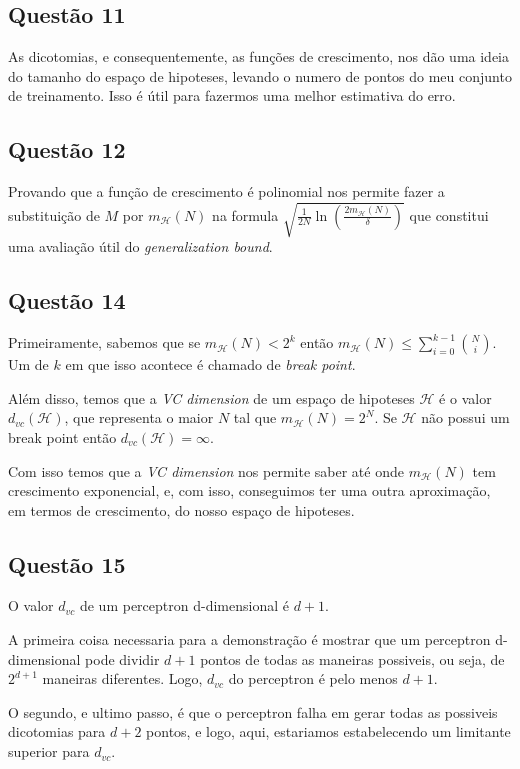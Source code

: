 \documentclass[12pt, a4paper]{article}
\begin{document}
\subsection*{Questão 11} {
    As dicotomias, e consequentemente, as funções de crescimento, nos dão uma ideia do tamanho do espaço de hipoteses, levando o numero de pontos do meu conjunto de treinamento. Isso é útil para fazermos uma melhor estimativa do erro.
}

\subsection*{Questão 12} {
    Provando que a função de crescimento é polinomial nos permite fazer a substituição de $ M $ por $ m_{\mathcal{H}}(N) $ na formula $ \sqrt{\frac{1}{2N} \ln(\frac{2m_{\mathcal{H}}(N)}{\delta})} $ que constitui uma avaliação útil do \emph{generalization bound}.   
}


\subsection*{Questão 14} {
    Primeiramente, sabemos que se $ m_{\mathcal{H}}(N) < 2^k $ então $ m_{\mathcal{H}}(N) \le \sum^{k-1}_{i = 0}\binom{N}{i} $. Um de $k$ em que isso acontece é chamado de \emph{break point}. 

    Além disso, temos que a \emph{VC dimension} de um espaço de hipoteses $\mathcal{H}$ é o valor $ d_{vc}(\mathcal{H}) $, que representa o maior $N$ tal que $ m_{\mathcal{H}}(N) = 2^N $. Se $\mathcal{H}$ não possui um break point então $d_{vc}(\mathcal{H}) = \infty$.

    Com isso temos que a \emph{VC dimension} nos permite saber até onde $ m_{\mathcal{H}}(N) $ tem crescimento exponencial, e, com isso, conseguimos ter uma outra aproximação, em termos de crescimento, do nosso espaço de hipoteses.
}

\subsection*{Questão 15} {
    O valor $d_{vc}$ de um perceptron d-dimensional é $d+1$.

    A primeira coisa necessaria para a demonstração é mostrar que um perceptron d-dimensional pode dividir $d+1$ pontos de todas as maneiras possiveis, ou seja, de $ 2^{d+1} $ maneiras diferentes. Logo, $ d_{vc} $ do perceptron é pelo menos $ d+1 $.

    O segundo, e ultimo passo, é que o perceptron falha em gerar todas as possiveis dicotomias para $ d+2 $ pontos, e logo, aqui, estariamos estabelecendo um limitante superior para $d_{vc}$.
}
\end{document}
